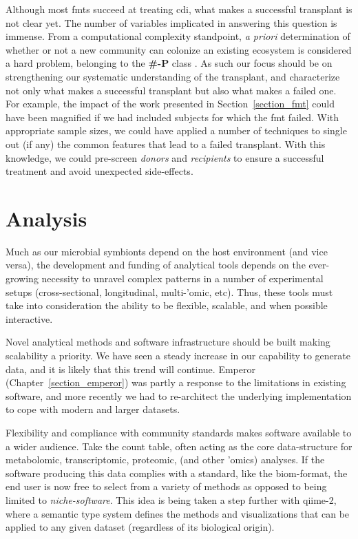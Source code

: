 Although most \glspl{fmt} succeed at treating \gls{cdi}, what makes a
successful transplant is not clear yet. The number of variables implicated in
answering this question is immense. From a computational complexity standpoint,
\textit{a priori} determination of whether or not a new community can colonize 
an existing ecosystem is considered a hard problem, belonging to the 
\textbf{\#-P} class \cite{RN4266}. As such our focus should be on strengthening 
our systematic understanding of the transplant, and characterize not only what 
makes a successful transplant but also what makes a failed one.  For example, 
the impact of the work presented in Section~\ref{section_fmt} could have been 
magnified if we had included subjects for which the \gls{fmt} failed. With 
appropriate sample sizes, we could have applied a number of techniques to 
single out (if any) the common features that lead to a failed transplant. With 
this knowledge, we could pre-screen \textit{donors} and \textit{recipients} to 
ensure a successful treatment and avoid unexpected side-effects.

\section{Analysis}

Much as our microbial symbionts depend on the host environment (and vice
versa), the development and funding of analytical tools depends on the
ever-growing necessity to unravel complex patterns in a number of experimental
setups (cross-sectional, longitudinal, multi-'omic, etc). Thus, these tools
must take into consideration the ability to be flexible, scalable, and when
possible interactive.

Novel analytical methods and software infrastructure should be built making 
scalability a priority.  We have seen a steady increase in our capability to 
generate data, and it is likely that this trend will continue. Emperor 
(Chapter~\ref{section_emperor}) was partly a response to the limitations in 
existing software, and more recently we had to re-architect the underlying 
implementation to cope with modern and larger datasets.

Flexibility and compliance with community standards makes software available
to a wider audience. Take the count table, often acting as the core
data-structure for metabolomic, transcriptomic, proteomic, (and other 'omics)
analyses. If the software producing this data complies with a standard, like
the \gls{biom}-format, the end user is now free to select from a variety of
methods as opposed to being limited to \textit{niche-software}. This idea is 
being taken a step further with \gls{qiime}-2, where a semantic type system 
defines the methods and visualizations that can be applied to any given dataset 
(regardless of its biological origin).

